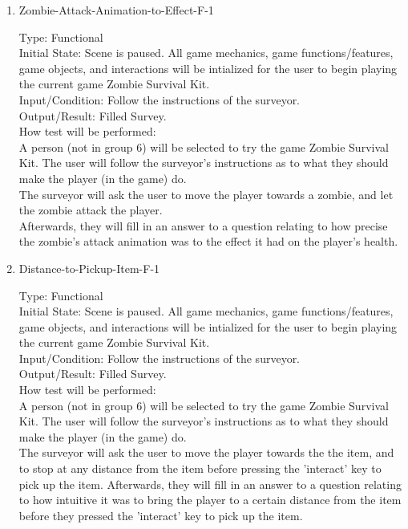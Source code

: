 \documentclass[12pt, titlepage]{article}
\newcounter{ftnum}
\newcounter{nftnum}
\begin{document}
\begin{enumerate}
	\item{Zombie-Attack-Animation-to-Effect-F-1\\}  \label{NF12}
	
	Type: Functional\\
	
	Initial State: Scene is paused. All game mechanics, game functions/features, game objects, and interactions will be intialized for the user to begin playing the current game Zombie Survival Kit.\\
	
	Input/Condition: Follow the instructions of the surveyor.\\
	
	Output/Result: Filled Survey.\\
	
	How test will be performed:\\ A person (not in group 6) will be selected to try the game Zombie Survival Kit. The user will follow the surveyor's instructions as to what they should make the player (in the game) do.\\ 
	The surveyor will ask the user to move the player towards a zombie, and let the zombie attack the player.\\
	Afterwards, they will fill in an answer to a question relating to how precise the zombie's attack animation was to the effect it had on the player's health.\\	
	
	\item{Distance-to-Pickup-Item-F-1\\}  \label{NF13}
	
	Type: Functional \\
	
	Initial State: Scene is paused. All game mechanics, game functions/features, game objects, and interactions will be intialized for the user to begin playing the current game Zombie Survival Kit. \\
	
	Input/Condition: Follow the instructions of the surveyor. \\
	
	Output/Result: Filled Survey. \\
	
	How test will be performed:\\ A person (not in group 6) will be selected to try the game Zombie Survival Kit. The user will follow the surveyor's instructions as to what they should make the player (in the game) do. \\
	The surveyor will ask the user to move the player towards the the item, and to stop at any distance from the item before pressing the 'interact' key to pick up the item.
	Afterwards, they will fill in an answer to a question relating to how intuitive it was to bring the player to a certain distance from the item before they pressed the 'interact' key to pick up the item.\\
	
\end{enumerate}
\end{document}
